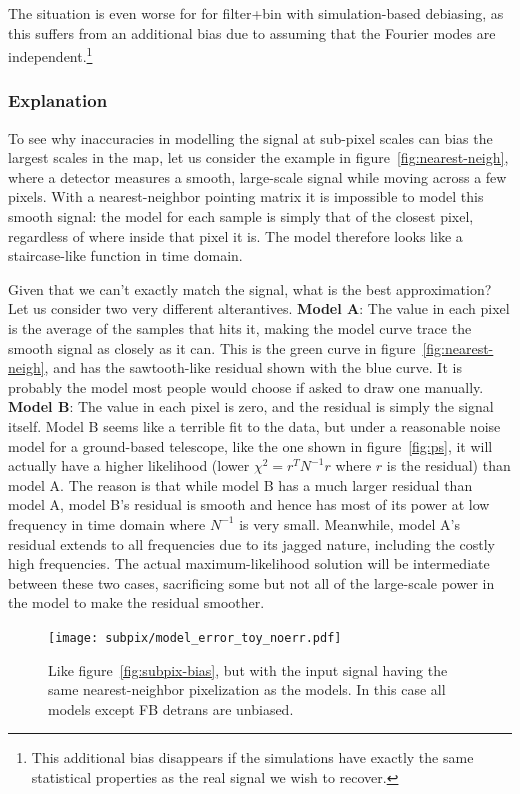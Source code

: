 \documentclass[twocolumn,apj]{aastex63}
\newcommand{\dfn}[1]{\textbf{#1}}
\begin{document}
The situation is even worse for for filter+bin with simulation-based debiasing,
as this suffers from an additional bias due to assuming that the Fourier modes
are independent.\footnote{This additional bias disappears if the simulations
have exactly the same statistical properties as the real signal we wish to
recover.}

\subsubsection{Explanation}
To see why inaccuracies in modelling the signal at sub-pixel scales can bias
the largest scales in the map, let us consider the example in figure~\ref{fig:nearest-neigh},
where a detector measures a smooth, large-scale signal while moving across a few
pixels. With a nearest-neighbor pointing matrix it is impossible to model this
smooth signal: the model for each sample is simply that of the closest pixel,
regardless of where inside that pixel it is. The model therefore looks like
a staircase-like function in time domain.

Given that we can't exactly match the signal, what is the best approximation?
Let us consider two very different alterantives. \dfn{Model A}: The value in each pixel
is the average of the samples that hits it, making the model curve trace the
smooth signal as closely as it can. This is the green curve in figure~\ref{fig:nearest-neigh},
and has the sawtooth-like residual shown with the blue curve. It is probably the
model most people would choose if asked to draw one manually.
\dfn{Model B}: The value in each pixel is zero, and the residual is simply the signal itself.
Model B seems like a terrible fit to the data, but under a reasonable noise model
for a ground-based telescope, like the one shown in figure~\ref{fig:ps}, it
will actually have a higher likelihood (lower $\chi^2 = r^TN^{-1}r$
where $r$ is the residual) than model A. The reason is that while model B has a much
larger residual than model A, model B's residual is smooth and hence has most of its
power at low frequency in time domain where $N^{-1}$ is very small. Meanwhile, model A's
residual extends to all frequencies due to its jagged nature, including the costly high
frequencies. The actual maximum-likelihood solution will be intermediate between these
two cases, sacrificing some but not all of the large-scale power in the model to make
the residual smoother.

\begin{figure}
	\centering
	\hspace*{-5mm}\texttt{[image: subpix/model\_error\_toy\_noerr.pdf]}
	\caption{
		Like figure~\ref{fig:subpix-bias}, but with the input signal
		having the same nearest-neighbor pixelization as the models.
		In this case all models except FB detrans are unbiased.
	}
	\label{fig:subpix-noerr}
\end{figure}
\end{document}
